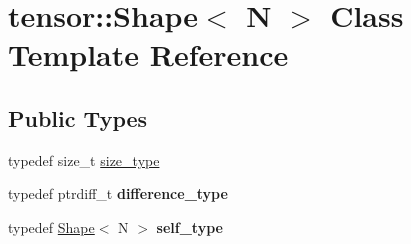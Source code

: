 \hypertarget{classtensor_1_1Shape}{}\section{tensor\+:\+:Shape$<$ N $>$ Class Template Reference}
\label{classtensor_1_1Shape}
\subsection*{Public Types}
\begin{DoxyCompactItemize}
\item 
typedef size\+\_\+t \hyperlink{classtensor_1_1Shape_a595f5b58456960a6f603f59b11b659ab}{size\+\_\+type}
\item 
typedef ptrdiff\+\_\+t {\bfseries difference\+\_\+type}\hypertarget{classtensor_1_1Shape_ac1cc4de9737856020b61d402577a28f3}{}\label{classtensor_1_1Shape_ac1cc4de9737856020b61d402577a28f3}

\item 
typedef \hyperlink{classtensor_1_1Shape}{Shape}$<$ N $>$ {\bfseries self\+\_\+type}\hypertarget{classtensor_1_1Shape_a56063360fd0f81afc92a47e45fe4bd94}{}\label{classtensor_1_1Shape_a56063360fd0f81afc92a47e45fe4bd94}

\end{DoxyCompactItemize}
